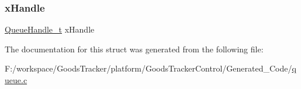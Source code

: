 \subsubsection{\texorpdfstring{x\+Handle}{xHandle}}
{\footnotesize\ttfamily \hyperlink{queue_8h_aaf19d499892a4ce1409326ece00f5264}{Queue\+Handle\+\_\+t} x\+Handle}



The documentation for this struct was generated from the following file\+:\begin{DoxyCompactItemize}
\item 
F\+:/workspace/\+Goods\+Tracker/platform/\+Goods\+Tracker\+Control/\+Generated\+\_\+\+Code/\hyperlink{queue_8c}{queue.\+c}\end{DoxyCompactItemize}
